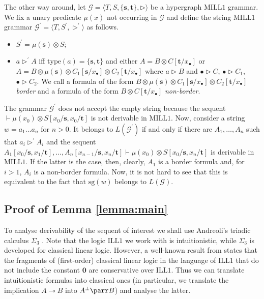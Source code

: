 \documentclass[a4paper,UKenglish,cleveref, autoref, thm-restate,pdfa]{lipics-v2021}
\newcommand{\Gram}{\mathcal{G}}
\newcommand{\type}{\mathrm{type}}
\newcommand{\SG}{\mathrm{sg}}
\newcommand{\lt}{\mathbf{s}}
\newcommand{\rt}{\mathbf{t}}
\newcommand{\mconj}{\otimes}
\newcommand{\limpl}{\multimap}
\newcommand{\ILLFO}{\mathrm{ILL}1}
\newcommand{\MILLFO}{\mathrm{MILL}1}
\begin{document}
The other way around, let $\Gram = \langle T, S, \{\lt,\rt\}, \triangleright \rangle$ be a hypergraph $\MILLFO$ grammar. We fix a unary predicate $\mu(x)$ not occurring in $\Gram$ and define the string $\MILLFO$ grammar $\Gram^\prime = \langle T, S^\prime, \triangleright^\prime \rangle$ as follows.
\begin{itemize}
	\item $S^\prime = \mu(\lt) \mconj S$;
	\item $a \triangleright^\prime A$ iff $\type(a) = \{\lt,\rt\}$ and either $A = B \mconj C[\rt/x_\bullet]$ or $A = B \mconj \mu(\lt) \mconj C_1[\lt/x_\bullet]\mconj C_2[\rt/x_\bullet]$ where $a \triangleright B$ and $\bullet \triangleright C$, $\bullet \triangleright C_1$, $\bullet \triangleright C_2$. We call a formula of the form $B \mconj \mu(\lt) \mconj C_1[\lt/x_\bullet]\mconj C_2[\rt/x_\bullet]$ \emph{border} and a formula of the form $B \mconj C[\rt/x_\bullet]$ \emph{non-border}.
\end{itemize}
The grammar $\Gram^\prime$ does not accept the empty string because the sequent $\vdash \mu(x_0) \mconj S[x_0/\lt,x_0/\rt]$ is not derivable in $\MILLFO$. Now, consider a string $w = a_1 \ldots a_n$ for $n>0$. It belongs to $L(\Gram^\prime)$ if and only if there are $A_1,\ldots,A_n$ such that $a_i \triangleright^\prime A_i$ and the sequent $A_1[x_0/\lt,x_1/\rt],\ldots,A_n[x_{n-1}/\lt,x_n/\rt] \vdash \mu(x_0) \mconj S[x_0/\lt,x_n/\rt]$ is derivable in $\MILLFO$. If the latter is the case, then, clearly, $A_1$ is a border formula and, for $i>1$, $A_i$ is a non-border formula. Now, it is not hard to see that this is equivalent to the fact that $\SG(w)$ belongs to $L(\Gram)$. 

\subsection{Proof of Lemma \ref{lemma:main}}\label{appendix:proof-lemma:main}

To analyse derivability of the sequent of interest we shall use Andreoli's triadic calculus $\Sigma_3$ \cite{Andreoli92}. Note that the logic $\ILLFO$ we work with is intuitionistic, while $\Sigma_3$ is developed for classical linear logic. However, a well-known result from \cite{Shellinx91} states that the fragments of (first-order) classical linear logic in the language of $\ILLFO$ that do not include the constant $\mathbf{0}$ are conservative over $\ILLFO$. Thus we can translate intuitionistic formulas into classical ones (in particular, we translate the implication $A \limpl B$ into $A^\bot \parr B$) and analyse the latter.
\end{document}
